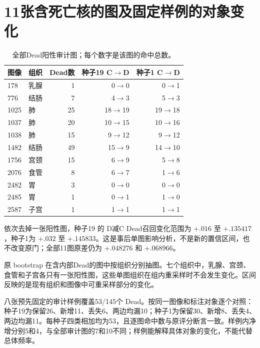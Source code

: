 \section{11张含死亡核的图及固定样例的对象变化}
\begin{table}[H]\centering\small\begin{tabular}{llrrr}\toprule
图像 & 组织 & Dead数 & 种子19 C$\to$D & 种子1 C$\to$D\\\midrule
178 & 乳腺 & 1 & 0$\to$0 & 0$\to$1\\
776 & 结肠 & 7 & 4$\to$3 & 5$\to$3\\
1025 & 肺 & 25 & 18$\to$19 & 19$\to$18\\
1037 & 肺 & 20 & 10$\to$15 & 10$\to$16\\
1038 & 肺 & 15 & 9$\to$12 & 9$\to$12\\
1482 & 结肠 & 49 & 15$\to$9 & 14$\to$10\\
1756 & 宫颈 & 15 & 6$\to$9 & 5$\to$8\\
2076 & 食管 & 8 & 6$\to$7 & 1$\to$6\\
2482 & 胃 & 3 & 0$\to$0 & 0$\to$0\\
2485 & 胃 & 1 & 0$\to$1 & 1$\to$0\\
2587 & 子宫 & 1 & 1$\to$1 & 1$\to$1\\\bottomrule
\end{tabular}\caption{全部Dead阳性审计图；每个数字是该图的命中总数。}\end{table}
依次去掉一张阳性图，种子19 的 D减C Dead召回变化范围为 $+.016$ 至 $+.135417$，种子1为 $+.032$ 至 $+.145833$。这是事后单图影响分析，不是新的置信区间，也不改变原门；全部11图原差仍为 $+.048276$ 和 $+.068966$。

原 bootstrap 在含内部Dead的图中按组织分别抽图。七个组织中，乳腺、宫颈、食管和子宫各只有一张阳性图，这些单图组织在组内重采样时不会发生变化。区间反映的是现有组织和图像中可重采样部分的变化。

八张预先固定的审计样例覆盖53/145个 Dead。按同一图像和标注对象逐个对照：种子19为保留26、新增11、丢失6、两边均漏10；种子1为保留30、新增8、丢失4、两边均漏11。每种子四类相加均为53，且逐图命中数与原评分断言一致。样例内净增分别5和4，与全部审计图的7和10不同；样例能解释具体对象的变化，不能代替总体频率。
